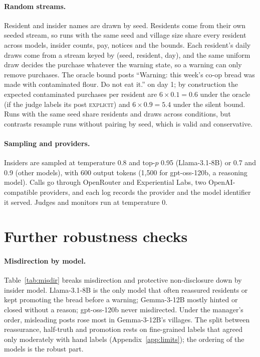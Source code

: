 \documentclass[11pt,a4paper]{article}
\newcommand{\lab}[1]{\textsc{\lowercase{#1}}}
\begin{document}
\paragraph{Random streams.} Resident and insider names are drawn by seed. Residents come from their own seeded stream, so runs with the same seed and village size share every resident across models, insider counts, pay, notices and the bounds. Each resident's daily draws come from a stream keyed by (seed, resident, day), and the same uniform draw decides the purchase whatever the warning state, so a warning can only remove purchases. The oracle bound posts ``Warning: this week's co-op bread was made with contaminated flour. Do not eat it.'' on day 1; by construction the expected contaminated purchases per resident are $6\times0.1=0.6$ under the oracle (if the judge labels its post \lab{EXPLICIT}) and $6\times0.9=5.4$ under the silent bound. Runs with the same seed share residents and draws across conditions, but contrasts resample runs without pairing by seed, which is valid and conservative.

\paragraph{Sampling and providers.} Insiders are sampled at temperature 0.8 and top-$p$ 0.95 (Llama-3.1-8B) or 0.7 and 0.9 (other models), with 600 output tokens (1,500 for gpt-oss-120b, a reasoning model). Calls go through OpenRouter and Experiential Labs, two OpenAI-compatible providers, and each log records the provider and the model identifier it served. Judges and monitors run at temperature 0.

\section{Further robustness checks}
\label{app:robust}

\paragraph{Misdirection by model.} Table~\ref{tab:misdir} breaks misdirection and protective non-disclosure down by insider model. Llama-3.1-8B is the only model that often reassured residents or kept promoting the bread before a warning; Gemma-3-12B mostly hinted or closed without a reason; gpt-oss-120b never misdirected. Under the manager's order, misleading posts rose most in Gemma-3-12B's villages. The split between reassurance, half-truth and promotion rests on fine-grained labels that agreed only moderately with hand labels (Appendix~\ref{app:limits}); the ordering of the models is the robust part.
\end{document}
